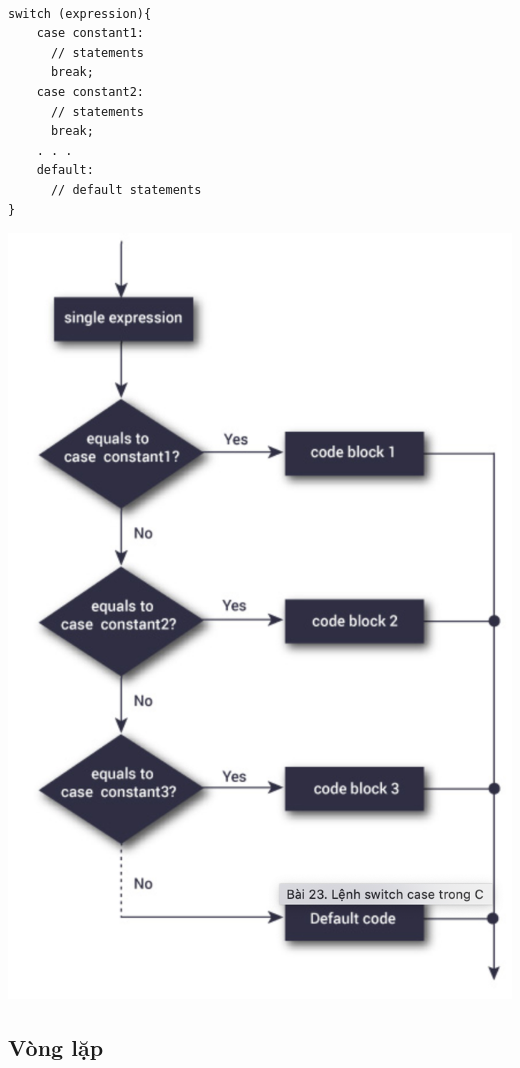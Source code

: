 \documentclass[12pt,a4paper]{article}
\begin{document}
\begin{lstlisting}

switch (expression){
    case constant1:
      // statements
      break;
    case constant2:
      // statements
      break;
    . . .
    default:
      // default statements
}
\end{lstlisting}
\begin{center}
	\includegraphics[scale = 0.45]{Switchcaseflowchart}
\end{center}

\begin{center}
\section*{Vòng lặp}	
\end{center}
\end{document}
